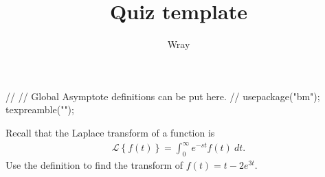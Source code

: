 \documentclass[addpoints, 12pt]{exam}
\title{Quiz template}
\author{Wray}
\newcommand{\laplace}[1]{\mathcal{L} \left\lbrace #1 \right\rbrace}
\begin{document}
\begin{asydef}
//
// Global Asymptote definitions can be put here.
//
usepackage("bm");
texpreamble("\def\V#1{\bm{#1}}");
\end{asydef}



\bigskip

             
\bigskip
\bigskip

\smallskip

\begin{questions}

\question[20]
Recall that the Laplace transform of a function is
\begin{align*}
	\laplace{f(t)} = \int_0^{\infty} e^{-st} f(t) \> dt.
\end{align*}
Use the definition to find the transform of $f(t) = t-2e^{3t}$.
\clearpage

\end{questions}
\end{document}
